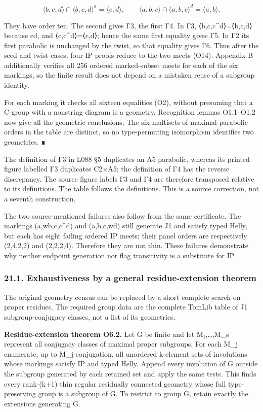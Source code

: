 \documentclass[
  10pt,
  letterpaper,
]{article}
\begin{document}
\[
\langle b,c,d\rangle\cap\langle b,c,d\rangle^a=\langle c,d\rangle,
\qquad
\langle a,b,c\rangle\cap\langle a,b,c\rangle^d=\langle a,b\rangle.
\tag{O14}
\]

They have order ten. The second gives Γ3, the first Γ4. In Γ3,
⟨b,c,c\^{}d⟩=⟨b,c,d⟩ because \textbar cd, and
⟨c,c\^{}d⟩=⟨c,d⟩; hence the same first equality gives Γ5. In Γ2 its
first parabolic is unchanged by the twist, so that equality gives Γ6.
Thus after the seed and twist cases, four IP proofs reduce to the two
meets (O14). Appendix B additionally verifies all 256 ordered
marked-subset meets for each of the six markings, so the finite result
does not depend on a mistaken reuse of a subgroup identity.

For each marking it checks all sixteen equalities (O2), without
presuming that a C-group with a nonstring diagram is a geometry.
Recognition lemmas O1.1--O1.2 now give all the geometric conclusions.
The six multisets of maximal-parabolic orders in the table are distinct,
so no type-permuting isomorphism identifies two geometries. ∎

The definition of Γ3 in L088 §5 duplicates an A5 parabolic, whereas its
printed figure labelled Γ3 duplicates C2×A5; the definition of Γ4 has
the reverse discrepancy. The source figure labels Γ3 and Γ4 are
therefore transposed relative to its definitions. The table follows the
definitions. This is a source correction, not a seventh construction.

The two source-mentioned failures also follow from the same certificate.
The markings (a,wb,c,c\^{}d) and (a,b,c,wd) still generate J1 and
satisfy typed Helly, but each has eight failing ordered IP meets; their
panel orders are respectively (2,4,2,2) and (2,2,2,4). Therefore they
are not thin. These failures demonstrate why neither endpoint generation
nor flag transitivity is a substitute for IP.

\subsubsection{21.1. Exhaustiveness by a general residue-extension
theorem}\label{exhaustiveness-by-a-general-residue-extension-theorem}

The original geometry census can be replaced by a short complete search
on proper residues. The required group data are the complete TomLib
table of J1 subgroup-conjugacy classes, not a list of its geometries.

\textbf{Residue-extension theorem O6.2.} Let G be finite and let
M₁,\ldots,M\_s represent all conjugacy classes of maximal proper
subgroups. For each M\_j enumerate, up to M\_j-conjugation, all
unordered k-element sets of involutions whose markings satisfy IP and
typed Helly. Append every involution of G outside the subgroup generated
by each retained set and apply the same tests. This finds every
rank-(k+1) thin regular residually connected geometry whose full
type-preserving group is a subgroup of G. To restrict to group G, retain
exactly the extensions generating G.
\end{document}
